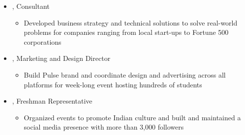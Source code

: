 \documentclass[10pt,letterpaper]{article}
\def\Vhrulefill{\leavevmode\leaders\hrule height 0.7ex depth \dimexpr0.4pt-0.7ex\hfill\kern0pt}
\begin{document}
\begin{itemize}[label={}]
 \item \small{, Consultant \hfill {}}
 \vspace{-1.58mm}
 \begin{itemize}[label={}]
 	\item \small{Developed business strategy and technical solutions to solve real-world problems for companies ranging from local start-ups to Fortune 500 corporations}
 \end{itemize}
 \item \small{, Marketing and Design Director \hfill {}}
 \vspace{-1.58mm}
 \begin{itemize}[label={}]
 	\item \small{Build Pulse brand and coordinate design and advertising across all platforms for week-long event hosting hundreds of students}
 \end{itemize}
 \item \small{, Freshman Representative \hfill {}}
 \vspace{-1.58mm}
 \begin{itemize}[label={}]
 	\item \small{Organized events to promote Indian culture and built and maintained a social media presence with more than 3,000 followers}
 \end{itemize}
\end{itemize}









%
%


\end{document}
